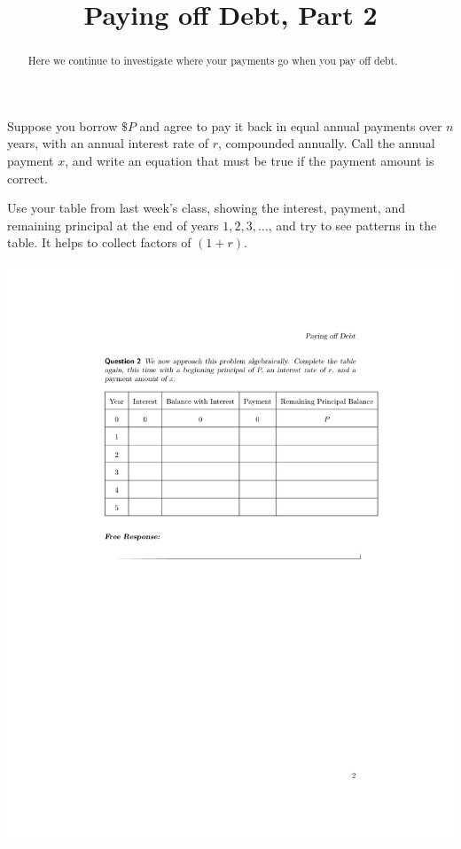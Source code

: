 \documentclass{ximera}
\title{Paying off Debt, Part 2}
\begin{document}
\begin{abstract}
Here we continue to investigate where your payments go when you pay off debt.
\end{abstract}
\maketitle


\begin{question}
Suppose you borrow $\$P$ and agree to pay it back in equal annual
payments over $n$ years, with an annual interest rate of $r$, compounded annually.  
Call the annual payment $x$, and write an equation that must be true if
the payment amount is correct.  

\begin{hint}
Use your table from last week's class, showing the interest, payment, and remaining
principal at the end of years $1, 2, 3, \dots$, and try to see
patterns in the table.  It helps to collect factors of $(1+r)$.
\end{hint} 
\includegraphics{payingOffDebtTableGraphic2.pdf}

\begin{freeResponse}
\end{freeResponse}
\end{question}
\end{document}
